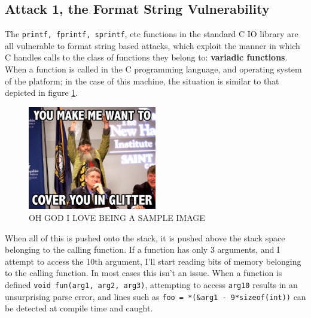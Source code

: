 \subsection{Attack 1, the Format String Vulnerability}

The {\tt printf, fprintf, sprintf}, etc functions in the standard C IO library are all vulnerable to format string based
attacks, which exploit the manner in which C handles calls to the class of functions they belong to: \textbf{variadic
functions}\cite{vfunc}. When a function is called in the C programming language,
and operating system of the platform; in the case of this machine, the situation is similar to that depicted in figure
\ref{fig_stack}. 

\begin{figure}[ht]     \centering     \includegraphics[width = 0.5\textwidth]{./images/placeholder.jpg}     \caption{OH
GOD I LOVE BEING A SAMPLE IMAGE}     \label{fig_stack} \end{figure}

When all of this is pushed onto the stack, it is pushed above the stack space belonging to the calling function. If a
function has only 3 arguments, and I attempt to access the 10th argument, I'll start reading bits of memory belonging to
the calling function. In most cases this isn't an issue. When a function is defined {\tt void fun(arg1, arg2, arg3)},
attempting to access {\tt arg10} results in an unsurprising parse error, and lines such as {\tt foo = *(\&arg1 -
9*sizeof(int))} can be detected at compile time and caught.

